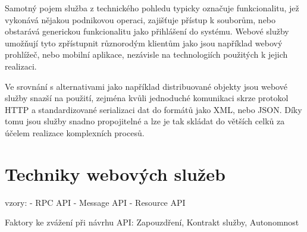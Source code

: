 \documentclass[czech,DP]{thesiskiv}
\begin{document}
Samotný pojem služba z technického pohledu typicky označuje funkcionalitu, jež vykonává nějakou podnikovou operaci, zajišťuje přístup k souborům, nebo obstarává generickou funkcionalitu jako přihlášení do systému. Webové služby umožňují tyto zpřístupnit různorodým klientům jako jsou například webový prohlížeč, nebo mobilní aplikace, nezávisle na technologiích použitých k jejich realizaci.

Ve srovnání s alternativami jako například distribuované objekty jsou webové služby snazší na použití, zejména kvůli jednoduché komunikaci skrze protokol HTTP a standardizované serializaci dat do formátů jako XML, nebo JSON. Díky tomu jsou služby snadno propojitelné a lze je tak skládat do větších celků za účelem realizace komplexních procesů\cite{fromObjectsToWs}.




\section{Techniky webových služeb}
\label{sec:ws-tech}


vzory:
- RPC API
- Message API
- Resource API

Faktory ke zvážení při návrhu API\cite{wsApiStyles}: Zapouzdření, Kontrakt služby, Autonomnost 
\end{document}
